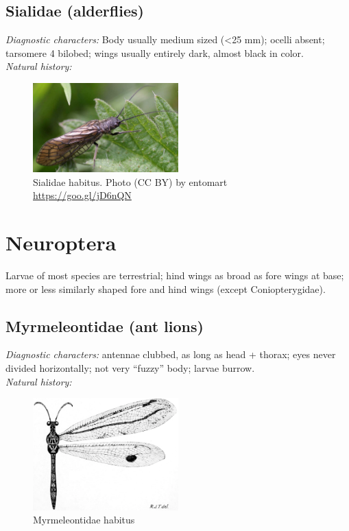 \documentclass[letterpaper, 11pt]{article}
\begin{document}
\subsection{Sialidae (alderflies)}
\noindent{}\textit{Diagnostic characters:} Body usually medium sized (\textless25 mm); ocelli absent; tarsomere 4 bilobed; wings usually entirely dark, almost black in color.\\

\noindent{}\textit{Natural history:}\\

\begin{figure}[ht!]
  \centering
    \includegraphics[width=0.5\textwidth]{SialidHabitus}
  \caption{Sialidae habitus. Photo (CC BY) by \textcopyright{}entomart \url{https://goo.gl/jD6nQN}}
  \label{fig:sialid1}
\end{figure}

\section{Neuroptera}
Larvae of most species are terrestrial; hind wings as broad as fore wings at base;  more or less similarly shaped fore and hind wings (except Coniopterygidae).\\

\subsection{Myrmeleontidae (ant lions)}
\noindent{}\textit{Diagnostic characters:} antennae clubbed, as long as head + thorax; eyes never divided horizontally; not very ``fuzzy'' body; larvae burrow.\\

\noindent{}\textit{Natural history:}\\

\begin{figure}[ht!]
  \centering
    \includegraphics[width=0.5\textwidth]{MyrmeleontidHabitus}
  \caption{Myrmeleontidae habitus \citep[][Fig. III.8]{tillyard1916}}
  \label{fig:myrmeleo}
\end{figure}
\end{document}
